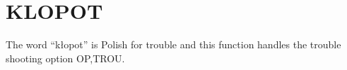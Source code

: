 \section{KLOPOT}
\label{sect:klopot}

\noindent The word ``k{\l}opot'' is Polish for trouble and this function
handles the trouble shooting option OP,TROU.\\
